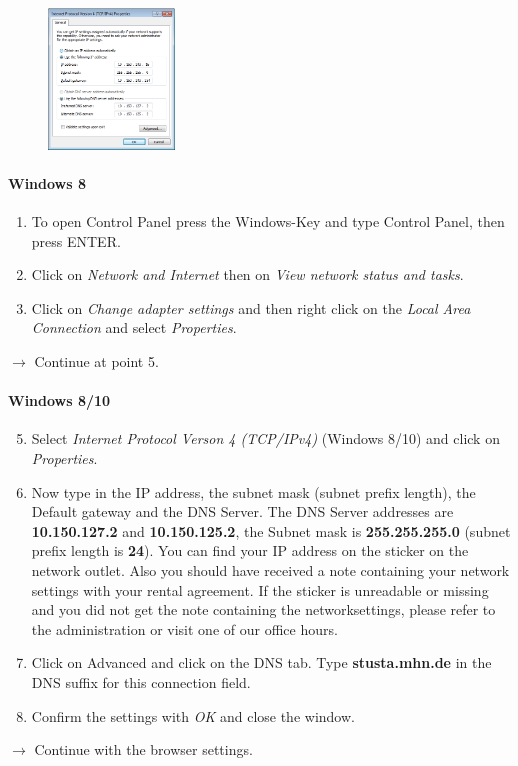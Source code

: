 \documentclass[a4paper,12pt]{scrartcl}
\begin{document}
\begin{figure}
\centering
  \includegraphics[width=0.3\textwidth]{Bilder/IP_Windows_EN}
\end{figure}

\paragraph*{Windows 8}
\begin{enumerate}
	\item To open Control Panel press the Windows-Key and type Control Panel, then press ENTER.
    \item Click on \emph{Network and Internet} then on \emph{View network status and tasks}.
	\item Click on \emph{Change adapter settings} and then right click on the \emph{Local Area Connection} and select \emph{Properties}.
\end{enumerate}
$\rightarrow$ Continue at point 5.

\paragraph*{Windows 8/10}
\begin{enumerate}
    \setcounter{enumi}{4}
	\item Select \emph{Internet Protocol Verson 4 (TCP/IPv4)} (Windows 8/10) and click on \emph{Properties}.
    \item Now type in the IP address, the subnet mask (subnet prefix length), the Default gateway and the DNS Server. The DNS Server addresses are \textbf{10.150.127.2} and \textbf{10.150.125.2}, the Subnet mask is \textbf{255.255.255.0} (subnet prefix length is \textbf{24}). You can find your IP address on the sticker on the network outlet. Also you should have received a note containing your network settings with your rental agreement. If the sticker is unreadable or missing and you did not get the note containing the networksettings, please refer to the administration or visit one of our office hours.
    \item Click on Advanced and click on the DNS tab. Type \textbf{stusta.mhn.de} in the DNS suffix for this connection field.
	\item Confirm the settings with \emph{OK} and close the window.
\end{enumerate}
$\rightarrow$ Continue with the browser settings.
\end{document}

